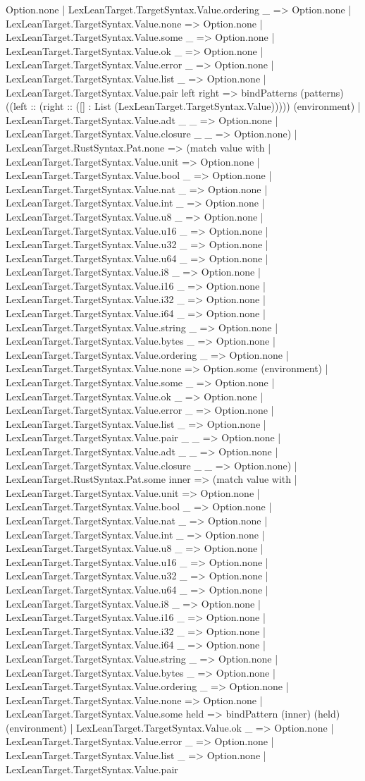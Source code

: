 \documentclass[11pt]{article}
\begin{document}
Option.none | LexLeanTarget.TargetSyntax.Value.ordering \_ => Option.none | LexLeanTarget.TargetSyntax.Value.none => Option.none | LexLeanTarget.TargetSyntax.Value.some \_ => Option.none | LexLeanTarget.TargetSyntax.Value.ok \_ => Option.none | LexLeanTarget.TargetSyntax.Value.error \_ => Option.none | LexLeanTarget.TargetSyntax.Value.list \_ => Option.none | LexLeanTarget.TargetSyntax.Value.pair left right => bindPatterns (patterns) ((left :: (right :: ([] : List (LexLeanTarget.TargetSyntax.Value))))) (environment) | LexLeanTarget.TargetSyntax.Value.adt \_ \_ => Option.none | LexLeanTarget.TargetSyntax.Value.closure \_ \_ => Option.none) | LexLeanTarget.RustSyntax.Pat.none => (match value with | LexLeanTarget.TargetSyntax.Value.unit => Option.none | LexLeanTarget.TargetSyntax.Value.bool \_ => Option.none | LexLeanTarget.TargetSyntax.Value.nat \_ => Option.none | LexLeanTarget.TargetSyntax.Value.int \_ => Option.none | LexLeanTarget.TargetSyntax.Value.u8 \_ => Option.none | LexLeanTarget.TargetSyntax.Value.u16 \_ => Option.none | LexLeanTarget.TargetSyntax.Value.u32 \_ => Option.none | LexLeanTarget.TargetSyntax.Value.u64 \_ => Option.none | LexLeanTarget.TargetSyntax.Value.i8 \_ => Option.none | LexLeanTarget.TargetSyntax.Value.i16 \_ => Option.none | LexLeanTarget.TargetSyntax.Value.i32 \_ => Option.none | LexLeanTarget.TargetSyntax.Value.i64 \_ => Option.none | LexLeanTarget.TargetSyntax.Value.string \_ => Option.none | LexLeanTarget.TargetSyntax.Value.bytes \_ => Option.none | LexLeanTarget.TargetSyntax.Value.ordering \_ => Option.none | LexLeanTarget.TargetSyntax.Value.none => Option.some (environment) | LexLeanTarget.TargetSyntax.Value.some \_ => Option.none | LexLeanTarget.TargetSyntax.Value.ok \_ => Option.none | LexLeanTarget.TargetSyntax.Value.error \_ => Option.none | LexLeanTarget.TargetSyntax.Value.list \_ => Option.none | LexLeanTarget.TargetSyntax.Value.pair \_ \_ => Option.none | LexLeanTarget.TargetSyntax.Value.adt \_ \_ => Option.none | LexLeanTarget.TargetSyntax.Value.closure \_ \_ => Option.none) | LexLeanTarget.RustSyntax.Pat.some inner => (match value with | LexLeanTarget.TargetSyntax.Value.unit => Option.none | LexLeanTarget.TargetSyntax.Value.bool \_ => Option.none | LexLeanTarget.TargetSyntax.Value.nat \_ => Option.none | LexLeanTarget.TargetSyntax.Value.int \_ => Option.none | LexLeanTarget.TargetSyntax.Value.u8 \_ => Option.none | LexLeanTarget.TargetSyntax.Value.u16 \_ => Option.none | LexLeanTarget.TargetSyntax.Value.u32 \_ => Option.none | LexLeanTarget.TargetSyntax.Value.u64 \_ => Option.none | LexLeanTarget.TargetSyntax.Value.i8 \_ => Option.none | LexLeanTarget.TargetSyntax.Value.i16 \_ => Option.none | LexLeanTarget.TargetSyntax.Value.i32 \_ => Option.none | LexLeanTarget.TargetSyntax.Value.i64 \_ => Option.none | LexLeanTarget.TargetSyntax.Value.string \_ => Option.none | LexLeanTarget.TargetSyntax.Value.bytes \_ => Option.none | LexLeanTarget.TargetSyntax.Value.ordering \_ => Option.none | LexLeanTarget.TargetSyntax.Value.none => Option.none | LexLeanTarget.TargetSyntax.Value.some held => bindPattern (inner) (held) (environment) | LexLeanTarget.TargetSyntax.Value.ok \_ => Option.none | LexLeanTarget.TargetSyntax.Value.error \_ => Option.none | LexLeanTarget.TargetSyntax.Value.list \_ => Option.none | LexLeanTarget.TargetSyntax.Value.pair 
\end{document}
